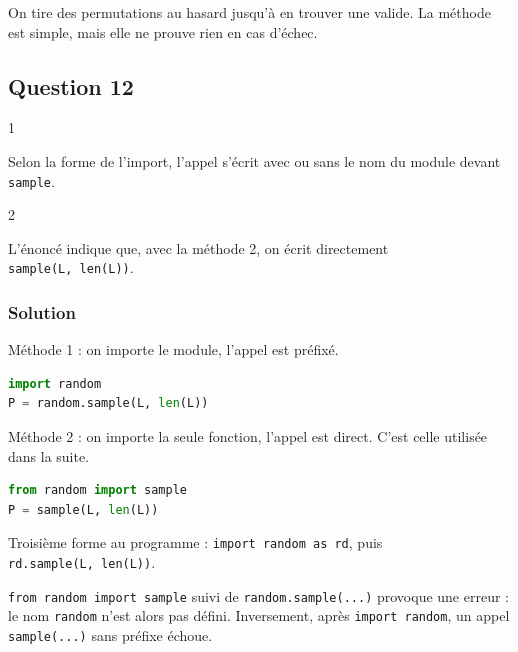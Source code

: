 \documentclass[11pt,a4paper]{article}
\begin{document}
On tire des permutations au hasard jusqu'à en trouver une valide. La méthode est simple, mais elle ne prouve rien en cas d'échec.

\hypertarget{question-12}{%
\subsection{Question 12}\label{question-12}}

\begin{indication}{1}

Selon la forme de l'import, l'appel s'écrit avec ou sans le nom du module devant \texttt{sample}.

\end{indication}

\begin{indication}{2}

L'énoncé indique que, avec la méthode 2, on écrit directement \texttt{sample(\allowbreak{}L,\allowbreak{}\ len(\allowbreak{}L)\allowbreak{})\allowbreak{}}.

\end{indication}

\hypertarget{solution-11}{%
\subsubsection{Solution}\label{solution-11}}

Méthode 1 : on importe le module, l'appel est préfixé.

\begin{lstlisting}[language=Python]
import random
P = random.sample(L, len(L))
\end{lstlisting}

Méthode 2 : on importe la seule fonction, l'appel est direct. C'est celle utilisée dans la suite.

\begin{lstlisting}[language=Python]
from random import sample
P = sample(L, len(L))
\end{lstlisting}

Troisième forme au programme : \texttt{import\ random\ as\ rd}, puis \texttt{rd.sample(\allowbreak{}L,\allowbreak{}\ len(\allowbreak{}L)\allowbreak{})\allowbreak{}}.

\begin{piege}

\texttt{from\ random\ import\ sample} suivi de \texttt{random.sample(\allowbreak{}...)\allowbreak{}} provoque une erreur : le nom \texttt{random} n'est alors pas défini. Inversement, après \texttt{import\ random}, un appel \texttt{sample(...)} sans préfixe échoue.

\end{piege}
\end{document}
